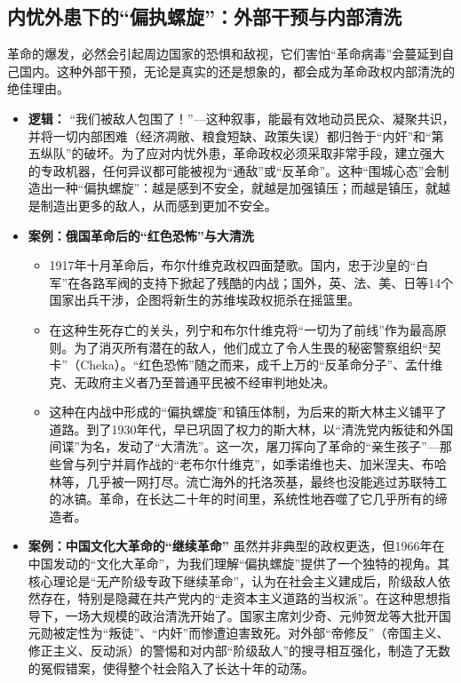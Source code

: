 \subsection{ 内忧外患下的“偏执螺旋”：外部干预与内部清洗}

革命的爆发，必然会引起周边国家的恐惧和敌视，它们害怕“革命病毒”会蔓延到自己国内。这种外部干预，无论是真实的还是想象的，都会成为革命政权内部清洗的绝佳理由。
\begin{itemize}
\item \textbf{逻辑：} “我们被敌人包围了！”---这种叙事，能最有效地动员民众、凝聚共识，并将一切内部困难（经济凋敝、粮食短缺、政策失误）都归咎于“内奸”和“第五纵队”的破坏。为了应对内忧外患，革命政权必须采取非常手段，建立强大的专政机器，任何异议都可能被视为“通敌”或“反革命”。这种“围城心态”会制造出一种“偏执螺旋”：越是感到不安全，就越是加强镇压；而越是镇压，就越是制造出更多的敌人，从而感到更加不安全。
\item \textbf{案例：俄国革命后的“红色恐怖”与大清洗}
    \begin{itemize}
    \item 1917年十月革命后，布尔什维克政权四面楚歌。国内，忠于沙皇的“白军”在各路军阀的支持下掀起了残酷的内战；国外，英、法、美、日等14个国家出兵干涉，企图将新生的苏维埃政权扼杀在摇篮里。
    \item 在这种生死存亡的关头，列宁和布尔什维克将“一切为了前线”作为最高原则。为了消灭所有潜在的敌人，他们成立了令人生畏的秘密警察组织“契卡”（Cheka）。“红色恐怖”随之而来，成千上万的“反革命分子”、孟什维克、无政府主义者乃至普通平民被不经审判地处决。
    \item 这种在内战中形成的“偏执螺旋”和镇压体制，为后来的斯大林主义铺平了道路。到了1930年代，早已巩固了权力的斯大林，以“清洗党内叛徒和外国间谍”为名，发动了“大清洗”。这一次，屠刀挥向了革命的“亲生孩子”---那些曾与列宁并肩作战的“老布尔什维克”，如季诺维也夫、加米涅夫、布哈林等，几乎被一网打尽。流亡海外的托洛茨基，最终也没能逃过苏联特工的冰镐。革命，在长达二十年的时间里，系统性地吞噬了它几乎所有的缔造者。
    \end{itemize}
\item \textbf{案例：中国文化大革命的“继续革命”}
    虽然并非典型的政权更迭，但1966年在中国发动的“文化大革命”，为我们理解“偏执螺旋”提供了一个独特的视角。其核心理论是“无产阶级专政下继续革命”，认为在社会主义建成后，阶级敌人依然存在，特别是隐藏在共产党内的“走资本主义道路的当权派”。在这种思想指导下，一场大规模的政治清洗开始了。国家主席刘少奇、元帅贺龙等大批开国元勋被定性为“叛徒”、“内奸”而惨遭迫害致死。对外部“帝修反”（帝国主义、修正主义、反动派）的警惕和对内部“阶级敌人”的搜寻相互强化，制造了无数的冤假错案，使得整个社会陷入了长达十年的动荡。
\end{itemize}

